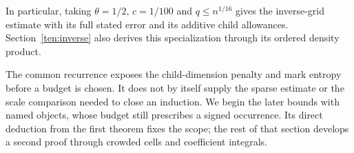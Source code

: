 In particular, taking $\theta=1/2$, $c=1/100$ and
$q\le n^{1/16}$ gives the inverse-grid estimate with its full stated
error and its additive child allowances. Section~\ref{ten:inverse}
also derives this specialization through its ordered density product.

The common recurrence exposes the child-dimension penalty and mark
entropy before a budget is chosen. It does not by itself supply the
sparse estimate or the scale comparison needed to close an induction.
We begin the later bounds with named objects, whose budget still
prescribes a signed occurrence. Its direct deduction from the first
theorem fixes the scope; the rest of that section develops a second
proof through crowded cells and coefficient integrals.
